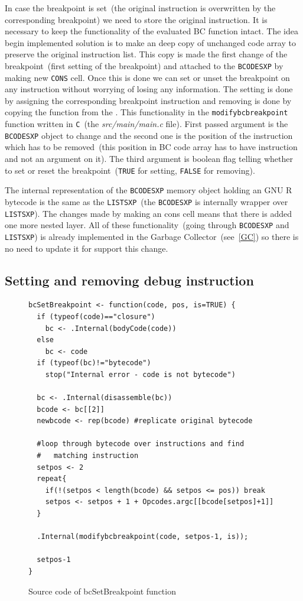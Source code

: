 \documentclass[thesis=M,english]{FITthesis}[2018/10/20]
\newcommand{\code}[1]{\texttt{#1}}
\begin{document}
In case the breakpoint is set~(the original instruction is overwritten by the corresponding breakpoint) we need to store the original instruction. It is necessary to keep the functionality of the evaluated BC function intact.
The idea begin implemented solution is to make an deep copy of unchanged code array to preserve the original instruction list. This copy is made the first change of the breakpoint~(first setting of the breakpoint) and attached to the \code{BCODESXP} by making new \code{CONS} cell. Once this is done we can set or unset the breakpoint on any instruction without worrying of losing any information. The setting is done by assigning the corresponding breakpoint instruction and removing is done by copying the function from the . This functionality in the \code{modifybcbreakpoint} function written in \code{C}~(the \textit{src/main/main.c} file). First passed argument is the \code{BCODESXP} object to change and the second one is the position of the instruction which has to be removed~(this position in BC code array has to have instruction and not an argument on it). The third argument is boolean flag telling whether to set or reset the breakpoint~(\code{TRUE} for setting, \code{FALSE} for removing).

The internal representation of the \code{BCODESXP} memory object holding an GNU R bytecode is the same as the \code{LISTSXP}~(the \code{BCODESXP} is internally wrapper over \code{LISTSXP}). The changes made by making an cons cell means that there is added one more nested layer. All of these functionality~(going through \code{BCODESXP} and \code{LISTSXP}) is already implemented in the Garbage Collector~(see~\ref{GC}) so there is no need to update it for support this change.

\subsection{Setting and removing debug instruction}\label{setting-and-unsetting-debug-instruction}

\begin{figure}[h]
\begin{lstlisting}
bcSetBreakpoint <- function(code, pos, is=TRUE) {
  if (typeof(code)=="closure")
    bc <- .Internal(bodyCode(code))
  else
    bc <- code
  if (typeof(bc)!="bytecode")
    stop("Internal error - code is not bytecode")

  bc <- .Internal(disassemble(bc))
  bcode <- bc[[2]]
  newbcode <- rep(bcode) #replicate original bytecode

  #loop through bytecode over instructions and find
  #   matching instruction
  setpos <- 2
  repeat{
    if(!(setpos < length(bcode) && setpos <= pos)) break
    setpos <- setpos + 1 + Opcodes.argc[[bcode[setpos]+1]]
  }

  .Internal(modifybcbreakpoint(code, setpos-1, is));

  setpos-1
}
\end{lstlisting}
	\caption{Source code of bcSetBreakpoint function}\label{fig:bcsetbreakpoint-source}
\end{figure}
\end{document}
